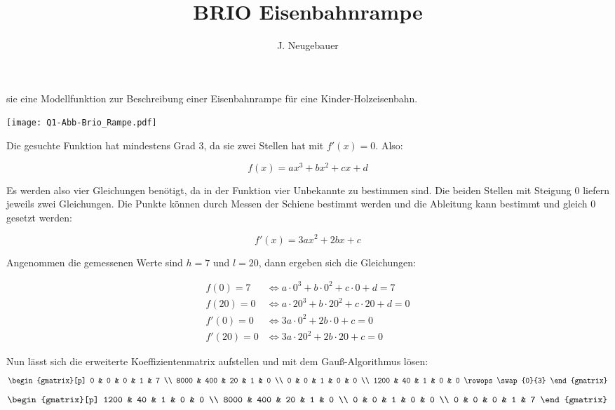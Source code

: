 \documentclass[11pt, a4paper]{scrartcl}
\author{J. Neugebauer}
\title{BRIO Eisenbahnrampe}
\date{\Heute}
\begin{document}
	\TITEL

	\begin{aufgabe}
		 sie eine Modellfunktion zur Beschreibung einer Eisenbahnrampe für eine Kinder-Holzeisenbahn.

		\texttt{[image: Q1-Abb-Brio\_Rampe.pdf]}

		\begin{loesung}
			Die gesuchte Funktion hat mindestens Grad 3, da sie zwei Stellen hat mit $f'(x) = 0$. Also:

			\[ f(x) = ax^3 + bx^2 + cx + d \]

			Es werden also vier Gleichungen benötigt, da in der Funktion vier Unbekannte zu bestimmen sind. Die beiden Stellen mit Steigung $0$ liefern jeweils zwei Gleichungen. Die Punkte können durch Messen der Schiene bestimmt werden und die Ableitung kann bestimmt und gleich $0$ gesetzt werden:

			\[ f'(x) = 3ax^2 + 2bx + c \]

			Angenommen die gemessenen Werte sind $h = 7$ und $l = 20$, dann ergeben sich die Gleichungen:

			\begin{align*}
				f(0) = 7 &\Leftrightarrow a\cdot 0^3 + b\cdot 0^2 + c\cdot 0 + d = 7 \\
				f(20) = 0 &\Leftrightarrow a\cdot 20^3 + b\cdot 20^2 + c\cdot 20 + d = 0 \\
				f'(0) = 0 &\Leftrightarrow 3a\cdot 0^2 + 2b\cdot 0 + c = 0 \\
				f'(20) = 0 &\Leftrightarrow 3a\cdot 20^2 + 2b\cdot 20 + c = 0
			\end{align*}

			Nun lässt sich die erweiterte Koeffizientenmatrix aufstellen und mit dem Gauß-Algorithmus lösen:
			\[ \begin{gmatrix}[p]
			0 & 0 & 0 & 1 & 7 \\
			8000 & 400 & 20 & 1 & 0 \\
			0 & 0 & 1 & 0 & 0 \\
			1200 & 40 & 1 & 0 & 0
			\rowops
			\swap{0}{3}
			\end{gmatrix} \]
			\[ \begin{gmatrix}[p]
			1200 & 40 & 1 & 0 & 0 \\
			8000 & 400 & 20 & 1 & 0 \\
			0 & 0 & 1 & 0 & 0 \\
			0 & 0 & 0 & 1 & 7
			\end{gmatrix} \]


\end{loesung}
\end{aufgabe}
\end{document}
